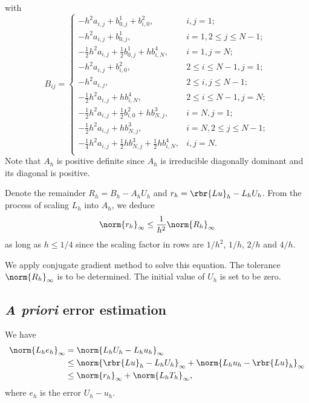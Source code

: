 \documentclass[english, nochinese]{pnote}
\newcommand\normi[1]{\norm{#1}_{\infty}}
\begin{document}
with
\begin{equation}
B_{ i j } =
\begin{cases}
-h^2 a_{ i, j } + b^1_{ 0, j } + b^2_{ i, 0 }, & i, j = 1; \\
-h^2 a_{ i, j } + b^1_{ 0, j }, & i = 1, 2 \le j \le N - 1; \\
-\frac{1}{2} h^2 a_{ i, j } + \frac{1}{2} b^1_{ 0, j } + h b^4_{ i, N }, & i = 1, j = N; \\
-h^2 a_{ i, j } + b^2_{ i, 0 }, & 2 \le i \le N - 1, j = 1; \\
-h^2 a_{ i, j }, & 2 \le i, j \le N - 1; \\
-\frac{1}{2} h^2 a_{ i, j } + h b^4_{ i, N }, & 2 \le i \le N - 1, j = N; \\
-\frac{1}{2} h^2 a_{ i, j } + \frac{1}{2} b^2_{ i, 0 } + h b^3_{ N, j }, & i = N, j = 1; \\
-\frac{1}{2} h^2 a_{ i, j } + h b^3_{ N, j }, & i = N, 2 \le j \le N - 1; \\
-\frac{1}{4} h^2 a_{ i, j } + \frac{1}{2} h b^3_{ N, j } + \frac{1}{2} h b^4_{ i, N }, & i, j = N. \\
\end{cases}
\end{equation}
Note that $A_h$ is positive definite since $A_h$ is irreducible diagonally dominant and its diagonal is positive.

Denote the remainder $ R_h = B_h - A_h U_h $ and $ r_h = \rbr{ L u }_h - L_h U_h $. From the process of scaling $L_h$ into $A_h$, we deduce
\begin{equation}
\normi{r_h} \le \frac{1}{h^2} \normi{R_h}
\end{equation}
as long as $ h \le 1 / 4 $ since the scaling factor in rows are $ 1 / h^2 $, $ 1 / h $, $ 2 / h $ and $ 4 / h $.

We apply conjugate gradient method to solve this equation. The tolerance $\normi{R_h}$ is to be determined. The initial value of $U_h$ is set to be zero.

\subsection{\textit{A priori} error estimation}

We have
\begin{equation}
\begin{split}
\normi{ L_h e_h } &= \normi{ L_h U_h - L_h u_h } \\
&\le \normi{ \rbr{ L u }_h - L_h U_h } + \normi{ L_h u_h - \rbr{ L u }_h } \\
&\le \normi{r_h} + \normi{ L_h T_h },
\end{split}
\end{equation}
where $e_h$ is the error $ U_h - u_h $.
\end{document}
